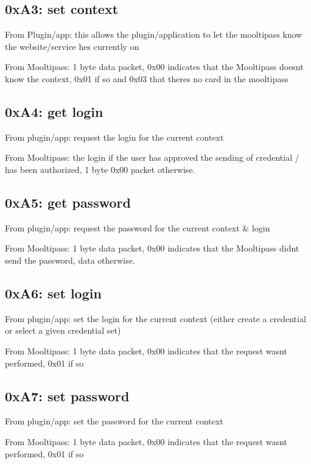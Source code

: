 \subsection*{0x\+A3\+: set context }

From Plugin/app\+: this allows the plugin/application to let the mooltipass know the website/service he\textquotesingle{}s currently on

From Mooltipass\+: 1 byte data packet, 0x00 indicates that the Mooltipass doesn\textquotesingle{}t know the context, 0x01 if so and 0x03 that there\textquotesingle{}s no card in the mooltipass

\subsection*{0x\+A4\+: get login }

From plugin/app\+: request the login for the current context

From Mooltipass\+: the login if the user has approved the sending of credential / has been authorized, 1 byte 0x00 packet otherwise.

\subsection*{0x\+A5\+: get password }

From plugin/app\+: request the password for the current context \& login

From Mooltipass\+: 1 byte data packet, 0x00 indicates that the Mooltipass didn\textquotesingle{}t send the password, data otherwise.

\subsection*{0x\+A6\+: set login }

From plugin/app\+: set the login for the current context (either create a credential or select a given credential set)

From Mooltipass\+: 1 byte data packet, 0x00 indicates that the request wasn\textquotesingle{}t performed, 0x01 if so

\subsection*{0x\+A7\+: set password }

From plugin/app\+: set the password for the current context

From Mooltipass\+: 1 byte data packet, 0x00 indicates that the request wasn\textquotesingle{}t performed, 0x01 if so

